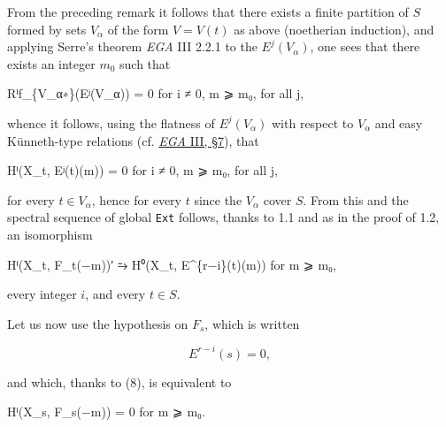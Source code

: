 \documentclass[
  11pt,
  a4paper,
]{book}
\newenvironment{Shaded}{}{}
\newcommand{\NormalTok}[1]{#1}
\begin{document}
From the preceding remark it follows that there exists a finite
partition of \(S\) formed by sets \(V_{\alpha}\) of the form
\(V = V(t)\) as above (noetherian induction), and applying Serre's
theorem \emph{EGA} III 2.2.1 to the \(E^{j}(V_{\alpha})\), one sees that
there exists an integer \(m_{0}\) such that

\begin{Shaded}
\begin{Highlighting}[]
\NormalTok{Rⁱf\_\{V\_α∗\}(Eʲ(V\_α)) = 0 for i ≠ 0, m ⩾ m₀, for all j,}
\end{Highlighting}
\end{Shaded}

whence it follows, using the flatness of \(E^{j}(V_{\alpha})\) with
respect to \(V_{\alpha}\) and easy Künneth-type relations (cf.
\href{https://jcreinhold.github.io/ega/iii/15-ch3-07-base-change-homological-functors.html\#7-study-of-base-change-in-the-covariant-homological-functors-of-modules}{\emph{EGA}
III, §7}), that

\begin{Shaded}
\begin{Highlighting}[]
\NormalTok{Hⁱ(X\_t, Eʲ(t)(m)) = 0 for i ≠ 0, m ⩾ m₀, for all j,}
\end{Highlighting}
\end{Shaded}

for every \(t \in V_{\alpha}\), hence for every \(t\) since the
\(V_{\alpha}\) cover \(S\). From this and the spectral sequence of
global \texttt{Ext} follows, thanks to 1.1 and as in the proof of 1.2,
an isomorphism

\begin{Shaded}
\begin{Highlighting}[]
\NormalTok{Hⁱ(X\_t, F\_t(−m))′ ⥲ H⁰(X\_t, E\^{}\{r−i\}(t)(m)) for m ⩾ m₀,}
\end{Highlighting}
\end{Shaded}

every integer \(i\), and every \(t \in S\).

Let us now use the hypothesis on \(F_{s}\), which is written

\[ E^{r-i}(s) = 0, \]

and which, thanks to (8), is equivalent to

\begin{Shaded}
\begin{Highlighting}[]
\NormalTok{Hⁱ(X\_s, F\_s(−m)) = 0 for m ⩾ m₀.}
\end{Highlighting}
\end{Shaded}
\end{document}
